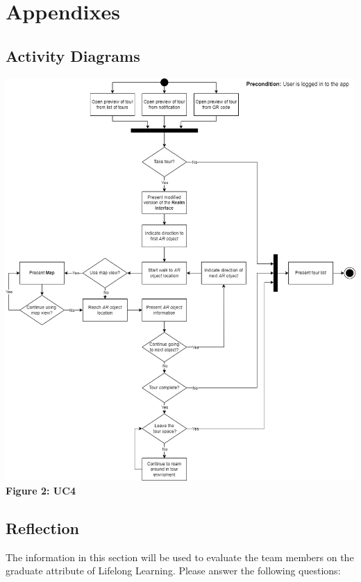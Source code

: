 \documentclass{article}
\begin{document}
\section{Appendixes}

\subsection{Activity Diagrams}
\label{sub:activity_diagrams}

\begin{center}
    \includegraphics[scale=0.4]{SequenceDiagrams/UC4.png}\\ 
    \textbf{Figure 2: UC4}
\end{center}

\subsection{Reflection}

The information in this section will be used to evaluate the team members on the
graduate attribute of Lifelong Learning.  Please answer the following questions:
\end{document}

